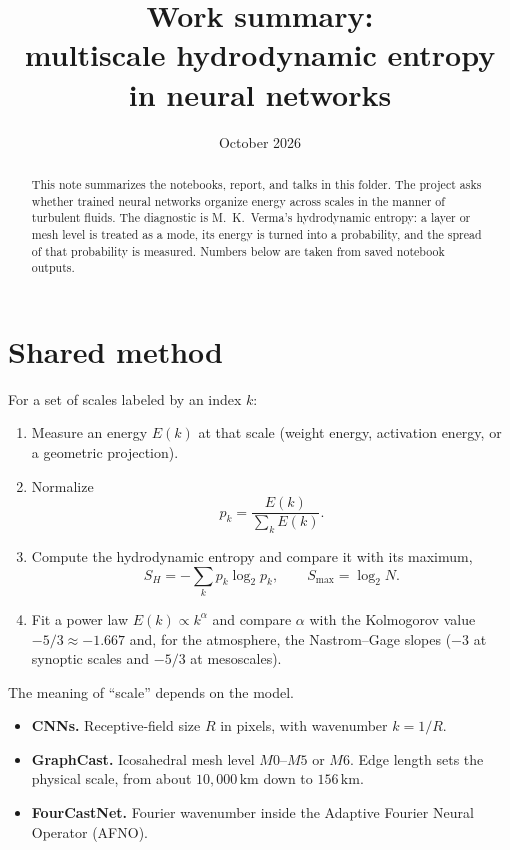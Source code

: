 \documentclass[11pt,a4paper]{article}
\title{Work summary:\\multiscale hydrodynamic entropy in neural networks}
\author{}
\date{October 2026}
\begin{document}
\maketitle

\begin{abstract}
This note summarizes the notebooks, report, and talks in this folder.
The project asks whether trained neural networks organize energy across scales in the manner of turbulent fluids.
The diagnostic is M.~K.~Verma's hydrodynamic entropy: a layer or mesh level is treated as a mode, its energy is turned into a probability, and the spread of that probability is measured.
Numbers below are taken from saved notebook outputs.
\end{abstract}

\section{Shared method}

For a set of scales labeled by an index \(k\):
\begin{enumerate}
  \item Measure an energy \(E(k)\) at that scale (weight energy, activation energy, or a geometric projection).
  \item Normalize
  \[
    p_k = \frac{E(k)}{\sum_k E(k)}.
  \]
  \item Compute the hydrodynamic entropy and compare it with its maximum,
  \[
    S_H = -\sum_k p_k \log_2 p_k,
    \qquad
    S_{\max} = \log_2 N.
  \]
  \item Fit a power law \(E(k) \propto k^{\alpha}\) and compare \(\alpha\) with the Kolmogorov value \(-5/3 \approx -1.667\) and, for the atmosphere, the Nastrom--Gage slopes (\(-3\) at synoptic scales and \(-5/3\) at mesoscales).
\end{enumerate}

The meaning of ``scale'' depends on the model.
\begin{itemize}
  \item \textbf{CNNs.} Receptive-field size \(R\) in pixels, with wavenumber \(k = 1/R\).
  \item \textbf{GraphCast.} Icosahedral mesh level \(M0\)--\(M5\) or \(M6\). Edge length sets the physical scale, from about \(10{,}000\,\mathrm{km}\) down to \(156\,\mathrm{km}\).
  \item \textbf{FourCastNet.} Fourier wavenumber inside the Adaptive Fourier Neural Operator (AFNO).
\end{itemize}
\end{document}
